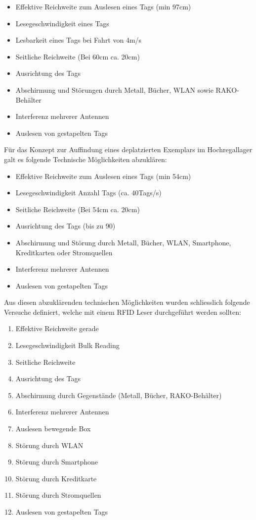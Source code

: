 \begin{itemize}
	\item Effektive Reichweite zum Auslesen eines Tags (min 97cm)
	\item Lesegeschwindigkeit eines Tags
	\item Lesbarkeit eines Tags bei Fahrt von 4m/s
	\item Seitliche Reichweite (Bei 60cm ca. 20cm)
	\item Ausrichtung des Tags
	\item Abschirmung und Störungen durch Metall, Bücher, WLAN sowie RAKO-Behälter
	\item Interferenz mehrerer Antennen
	\item Auslesen von gestapelten Tags
\end{itemize}
Für das Konzept zur Auffindung eines deplatzierten Exemplars im Hochregallager galt es folgende Technische Möglichkeiten abzuklären:
\begin{itemize}
	\item Effektive Reichweite zum Auslesen eines Tags (min 54cm)
	\item Lesegeschwindigkeit Anzahl Tags (ca. 40Tags/s)
	\item Seitliche Reichweite (Bei 54cm ca. 20cm)
	\item Ausrichtung des Tags (bis zu 90\SIUnitSymbolDegree)
	\item Abschirmung und Störung durch Metall, Bücher, WLAN, Smartphone, Kreditkarten oder Stromquellen
	\item Interferenz mehrerer Antennen
	\item Auslesen von gestapelten Tags
\end{itemize}

Aus diesen abzuklärenden technischen Möglichkeiten wurden schliesslich folgende Versuche definiert, welche mit einem RFID Leser durchgeführt werden sollten:
\begin{enumerate}
	\item Effektive Reichweite gerade
	\item Lesegeschwindigkeit Bulk Reading
	\item Seitliche Reichweite
	\item Ausrichtung des Tags
	\item Abschirmung durch Gegenstände (Metall, Bücher, RAKO-Behälter)
	\item Interferenz mehrerer Antennen
	\item Auslesen bewegende Box
	\item Störung durch WLAN
	\item Störung durch Smartphone
	\item Störung durch Kreditkarte
	\item Störung durch Stromquellen
	\item Auslesen von gestapelten Tags
\end{enumerate}

